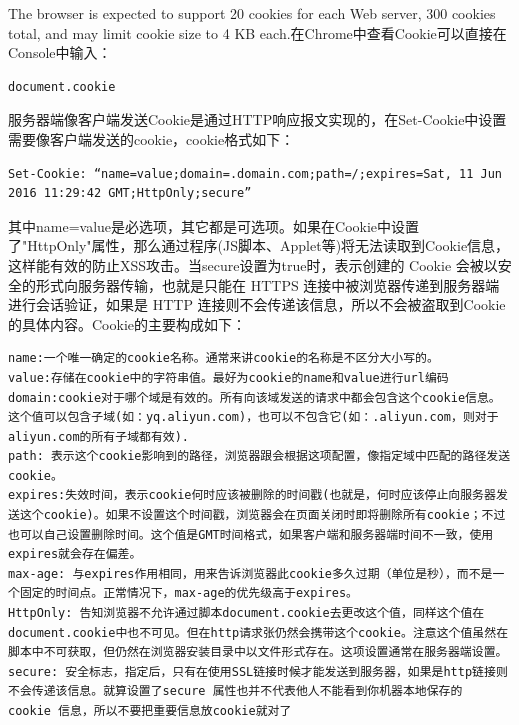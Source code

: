 \documentclass[12pt]{book}
\numberwithin{dummy}{section}
\theoremstyle{ocrenumbox}
\theoremstyle{blacknumex}
\theoremstyle{blacknumbox}
\theoremstyle{ocrenum}
\begin{document}
The browser is expected to support 20 cookies for each Web server, 300 cookies total, and may limit cookie size to 4 KB each.在Chrome中查看Cookie可以直接在Console中输入：

\begin{lstlisting}[language=Bash]
document.cookie
\end{lstlisting}

服务器端像客户端发送Cookie是通过HTTP响应报文实现的，在Set-Cookie中设置需要像客户端发送的cookie，cookie格式如下：

\begin{lstlisting}
Set-Cookie: “name=value;domain=.domain.com;path=/;expires=Sat, 11 Jun 2016 11:29:42 GMT;HttpOnly;secure”
\end{lstlisting}

其中name=value是必选项，其它都是可选项。如果在Cookie中设置了"HttpOnly"属性，那么通过程序(JS脚本、Applet等)将无法读取到Cookie信息，这样能有效的防止XSS攻击。当secure设置为true时，表示创建的 Cookie 会被以安全的形式向服务器传输，也就是只能在 HTTPS 连接中被浏览器传递到服务器端进行会话验证，如果是 HTTP 连接则不会传递该信息，所以不会被盗取到Cookie 的具体内容。Cookie的主要构成如下：

\begin{lstlisting}
name:一个唯一确定的cookie名称。通常来讲cookie的名称是不区分大小写的。
value:存储在cookie中的字符串值。最好为cookie的name和value进行url编码
domain:cookie对于哪个域是有效的。所有向该域发送的请求中都会包含这个cookie信息。这个值可以包含子域(如：yq.aliyun.com)，也可以不包含它(如：.aliyun.com，则对于aliyun.com的所有子域都有效).
path: 表示这个cookie影响到的路径，浏览器跟会根据这项配置，像指定域中匹配的路径发送cookie。
expires:失效时间，表示cookie何时应该被删除的时间戳(也就是，何时应该停止向服务器发送这个cookie)。如果不设置这个时间戳，浏览器会在页面关闭时即将删除所有cookie；不过也可以自己设置删除时间。这个值是GMT时间格式，如果客户端和服务器端时间不一致，使用expires就会存在偏差。
max-age: 与expires作用相同，用来告诉浏览器此cookie多久过期（单位是秒），而不是一个固定的时间点。正常情况下，max-age的优先级高于expires。
HttpOnly: 告知浏览器不允许通过脚本document.cookie去更改这个值，同样这个值在document.cookie中也不可见。但在http请求张仍然会携带这个cookie。注意这个值虽然在脚本中不可获取，但仍然在浏览器安装目录中以文件形式存在。这项设置通常在服务器端设置。
secure: 安全标志，指定后，只有在使用SSL链接时候才能发送到服务器，如果是http链接则不会传递该信息。就算设置了secure 属性也并不代表他人不能看到你机器本地保存的 cookie 信息，所以不要把重要信息放cookie就对了
\end{lstlisting}
\end{document}
